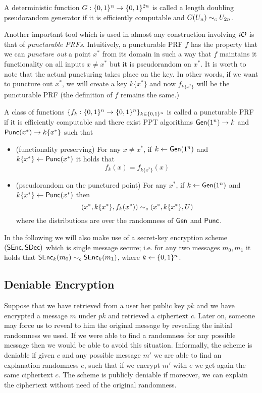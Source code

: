 \begin{mydef}
A deterministic function $G:\{0,1\}^n\to\{0,1\}^{2n}$ is called a length doubling pseudorandom generator if it is efficiently computable and $G(U_n)\sim_c U_{2n}$.
\end{mydef}

Another important tool which is used in almost any construction involving $i\mathcal{O}$ is that of \emph{puncturable PRFs}. Intuitively, a puncturable PRF $f$ has the property that we can \emph{puncture out} a point $x^*$ from its domain in such a way that $f$ maintains it functionality on all inputs $x\ne x^*$ but it is pseudorandom on $x^*$. It is worth to note that the actual puncturing takes place on the key. In other words, if we want to puncture out $x^*$, we will create a key $k\{x^*\}$ and now $f_{k\{x^*\}}$ will be the puncturable PRF (the definition of $f$ remains the same.)

\begin{mydef}
A class of functions $\{f_k:\{0,1\}^n\to\{0,1\}^n\}_{k\in\{0,1\}^n}$ is called a puncturable PRF if it is efficiently computable and there exist PPT algorithms $\mathsf{Gen}(1^n)\to k$ and $\mathsf{Punc}(x^*)\to k\{x^*\}$ such that
\begin{itemize}
\item (functionality preserving) For any $x\ne x^*$, if $k\gets\mathsf{Gen}(1^n)$ and $k\{x^*\}\gets\mathsf{Punc}(x^*)$ it holds that
\[
f_k(x)=f_{k\{x^*\}}(x)
\]
\item (pseudorandom on the punctured point) For any $x^*$, if $k\gets\mathsf{Gen}(1^n)$ and $k\{x^*\}\gets\mathsf{Punc}(x^*)$ then
\[
\left(x^*,k\{x^*\},f_k(x^*)\right)\sim_c \left(x^*,k\{x^*\},U\right)
\]
where the distributions are over the randomness of $\mathsf{Gen}$ and $\mathsf{Punc}$.
\end{itemize}
\end{mydef}

In the following we will also make use of a secret-key encryption scheme $(\mathsf{SEnc},\mathsf{SDec})$ which is single message secure; i.e. for any two messages $m_0,m_1$ it holds that $\mathsf{SEnc}_k(m_0)\sim_c\mathsf{SEnc}_k(m_1)$, where $k\gets\{0,1\}^n$.


\subsection{Deniable Encryption}
Suppose that we have retrieved from a user her public key $pk$ and we have encrypted a message $m$ under $pk$ and retrieved a ciphertext $c$. Later on, someone may force us to reveal to him the original message by revealing the initial randomness we used. If we were able to find a randomness for any possible message then we would be able to avoid this situation. Informally, the scheme is deniable if given $c$ and any possible message $m'$ we are able to find an explanation randomness $e$, such that if we encrypt $m'$ with $e$ we get again the same ciphertext $c$. The scheme is publicly deniable if moreover, we can explain the ciphertext without need of the original randomness.

